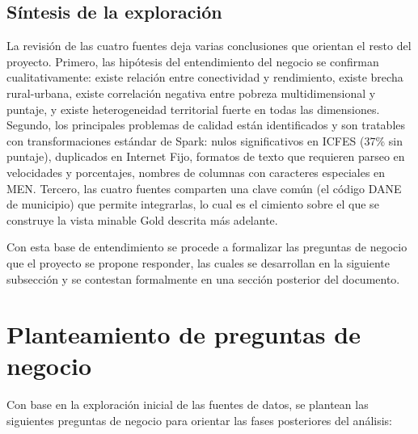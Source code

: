 \subsection{Síntesis de la exploración}
La revisión de las cuatro fuentes deja varias conclusiones que orientan el resto del proyecto. Primero, las hipótesis del entendimiento del negocio se confirman cualitativamente: existe relación entre conectividad y rendimiento, existe brecha rural-urbana, existe correlación negativa entre pobreza multidimensional y puntaje, y existe heterogeneidad territorial fuerte en todas las dimensiones. Segundo, los principales problemas de calidad están identificados y son tratables con transformaciones estándar de Spark: nulos significativos en ICFES (37\% sin puntaje), duplicados en Internet Fijo, formatos de texto que requieren parseo en velocidades y porcentajes, nombres de columnas con caracteres especiales en MEN. Tercero, las cuatro fuentes comparten una clave común (el código DANE de municipio) que permite integrarlas, lo cual es el cimiento sobre el que se construye la vista minable Gold descrita más adelante.

Con esta base de entendimiento se procede a formalizar las preguntas de negocio que el proyecto se propone responder, las cuales se desarrollan en la siguiente subsección y se contestan formalmente en una sección posterior del documento.

\section{Planteamiento de preguntas de negocio}

Con base en la exploración inicial de las fuentes de datos, se plantean las siguientes preguntas de negocio para orientar las fases posteriores del análisis:

